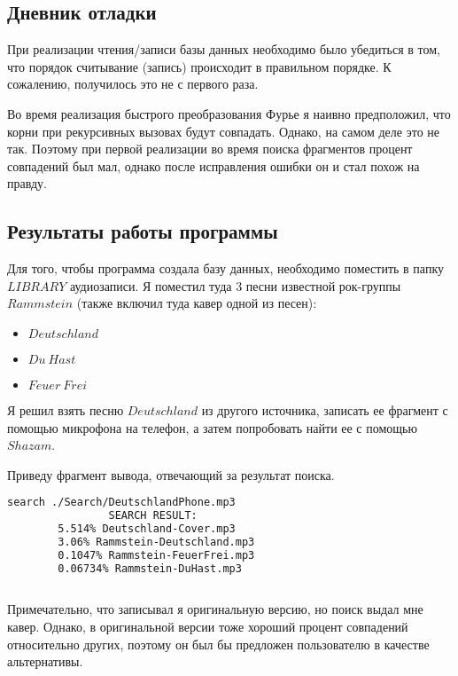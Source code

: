 \documentclass[12pt]{article}
\begin{document}
	\noindent\makebox[\linewidth]{\rule{\paperwidth}{0.4pt}}
	\inputminted[breaklines]{C++}{../src/Shazam.h}
	\vspace{5mm}
	\noindent\makebox[\linewidth]{\rule{\paperwidth}{0.4pt}}
	
	\inputminted[breaklines]{C++}{../src/Shazam.cpp}
	\vspace{5mm}
	\noindent\makebox[\linewidth]{\rule{\paperwidth}{0.4pt}}
	
	\inputminted[breaklines]{C++}{../src/main.cpp}
	\newpage
	\subsection*{Дневник отладки}

	При реализации чтения/записи базы данных необходимо было убедиться в том, что порядок считывание (запись) происходит в правильном порядке. К сожалению, получилось это не с первого раза.
	
	Во время реализация быстрого преобразования Фурье я наивно предположил,  что корни при рекурсивных вызовах будут совпадать. Однако, на самом деле это не так. Поэтому при первой реализации во время поиска фрагментов процент совпадений был мал, однако после исправления ошибки он и стал похож на правду.
	
	\subsection*{Результаты работы программы}
	
	Для того, чтобы программа создала базу данных, необходимо поместить в папку $LIBRARY$ аудиозаписи. Я поместил туда 3 песни  известной рок-группы $Rammstein$ (также включил туда кавер одной из песен):
	\begin{itemize}
		\item $Deutschland$
		\item $Du\: Hast$
		\item $ Feuer \: Frei$
	\end{itemize} 

	Я решил взять песню $Deutschland$ из другого источника, записать ее фрагмент с помощью микрофона на телефон, а затем попробовать найти ее с помощью $Shazam$.
	
	\bigskip
	Приведу фрагмент вывода, отвечающий за результат поиска.

	\begin{lstlisting}[language=bash]
		search ./Search/DeutschlandPhone.mp3
				SEARCH RESULT:
		5.514% Deutschland-Cover.mp3
		3.06% Rammstein-Deutschland.mp3
		0.1047% Rammstein-FeuerFrei.mp3
		0.06734% Rammstein-DuHast.mp3
		
	\end{lstlisting}
	Примечательно, что записывал я оригинальную версию, но поиск выдал мне кавер. Однако, в оригинальной версии тоже хороший процент совпадений относительно других, поэтому он был бы предложен пользователю в качестве альтернативы.
	
\end{document}
